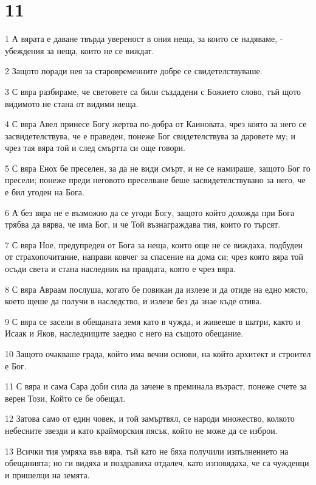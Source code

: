 \chapter{11}

\par 1 А вярата е даване твърда увереност в ония неща, за които се надяваме, - убеждения за неща, които не се виждат.
\par 2 Защото поради нея за старовременните добре се свидетелствуваше.
\par 3 С вяра разбираме, че световете са били създадени с Божието слово, тъй щото видимото не стана от видими неща.
\par 4 С вяра Авел принесе Богу жертва по-добра от Каиновата, чрез която за него се засвидетелствува, че е праведен, понеже Бог свидетелствува за даровете му; и чрез тая вяра той и след смъртта си още говори.
\par 5 С вяра Енох бе преселен, за да не види смърт, и не се намираше, защото Бог го пресели; понеже преди неговото преселване беше засвидетелствувано за него, че е бил угоден на Бога.
\par 6 А без вяра не е възможно да се угоди Богу, защото който дохожда при Бога трябва да вярва, че има Бог, и че Той възнаграждава тия, които го търсят.
\par 7 С вяра Ное, предупреден от Бога за неща, които още не се виждаха, подбуден от страхопочитание, направи ковчег за спасение на дома си; чрез която вяра той осъди света и стана наследник на правдата, която е чрез вяра.
\par 8 С вяра Авраам послуша, когато бе повикан да излезе и да отиде на едно място, което щеше да получи в наследство, и излезе без да знае къде отива.
\par 9 С вяра се засели в обещаната земя като в чужда, и живееше в шатри, както и Исаак и Яков, наследниците заедно с него на същото обещание.
\par 10 Защото очакваше града, който има вечни основи, на който архитект и строител е Бог.
\par 11 С вяра и сама Сара доби сила да зачене в преминала възраст, понеже счете за верен Този, Който се бе обещал.
\par 12 Затова само от един човек, и той замъртвял, се народи множество, колкото небесните звезди и като крайморския пясък, който не може да се изброи.
\par 13 Всички тия умряха във вяра, тъй като не бяха получили изпълнението на обещанията; но ги видяха и поздравиха отдалеч, като изповядаха, че са чужденци и пришелци на земята.
